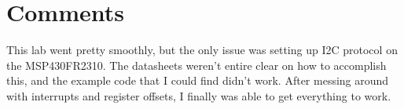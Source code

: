 \documentclass{article}
\begin{document}

%


\section*{Comments}

This lab went pretty smoothly, but the only issue was setting up I2C protocol on the MSP430FR2310. The datasheets weren't entire clear on how to accomplish this, and the example code that I could find didn't work. After messing around with interrupts and register offsets, I finally was able to get everything to work.





%
%


%
\end{document}
